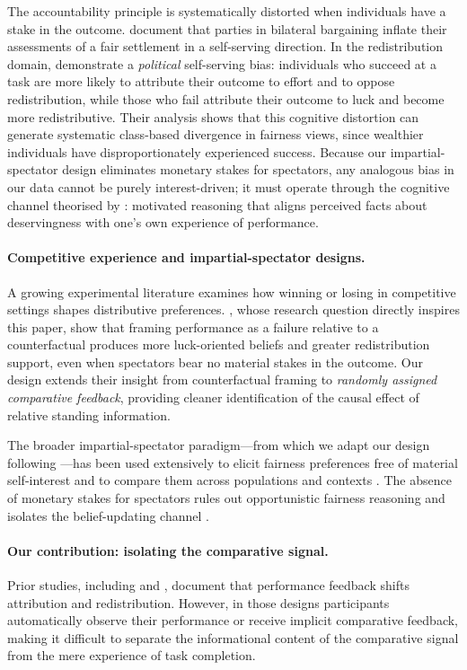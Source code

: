\documentclass[12pt]{article}
\begin{document}
The accountability principle is systematically distorted when individuals
have a stake in the outcome.
\citet{Babcock1995} document that parties in bilateral bargaining inflate
their assessments of a fair settlement in a self-serving direction.
In the redistribution domain, \citet{Deffains2016} demonstrate a
\emph{political} self-serving bias: individuals who succeed at a task are
more likely to attribute their outcome to effort and to oppose redistribution,
while those who fail attribute their outcome to luck and become more
redistributive.
Their analysis shows that this cognitive distortion can generate systematic
class-based divergence in fairness views, since wealthier individuals have
disproportionately experienced success.
Because our impartial-spectator design eliminates monetary stakes for
spectators, any analogous bias in our data cannot be purely interest-driven;
it must operate through the cognitive channel theorised by \citet{Kunda1990}:
motivated reasoning that aligns perceived facts about deservingness with
one's own experience of performance.

\paragraph{Competitive experience and impartial-spectator designs.}
A growing experimental literature examines how winning or losing in
competitive settings shapes distributive preferences.
\citet{Cassar2019}, whose research question directly inspires this paper,
show that framing performance as a failure relative to a counterfactual
produces more luck-oriented beliefs and greater redistribution support,
even when spectators bear no material stakes in the outcome.
Our design extends their insight from counterfactual framing to
\emph{randomly assigned comparative feedback}, providing cleaner
identification of the causal effect of relative standing information.

The broader impartial-spectator paradigm---from which we adapt our design
following \citet{Almas2020}---has been used extensively to elicit fairness
preferences free of material self-interest and to compare them across
populations and contexts \citep{Cappelen2007, Cappelen2013}.
The absence of monetary stakes for spectators rules out opportunistic
fairness reasoning and isolates the belief-updating channel \citep{Babcock1995}.

\paragraph{Our contribution: isolating the comparative signal.}
Prior studies, including \citet{Deffains2016} and \citet{Cassar2019},
document that performance feedback shifts attribution and redistribution.
However, in those designs participants automatically observe their performance
or receive implicit comparative feedback, making it difficult to separate
the informational content of the comparative signal from the mere experience
of task completion.
\end{document}
